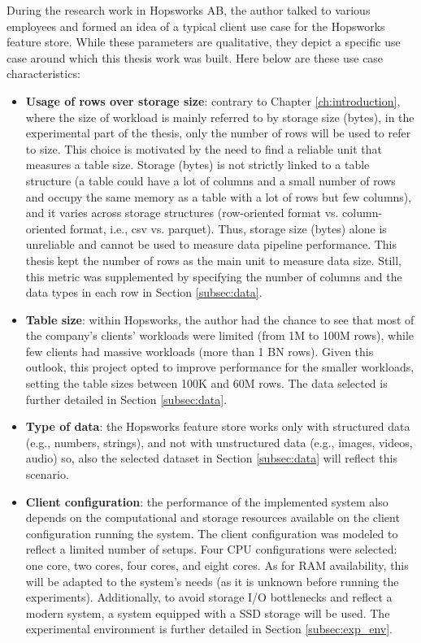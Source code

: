 During the research work in Hopsworks \gls{AB}, the author talked to various employees and formed an idea of a typical client use case for the Hopsworks feature store. While these parameters are qualitative, they depict a specific use case around which this thesis work was built. Here below are these use case characteristics:
\begin{itemize}
  \item \textbf{Usage of rows over storage size}: contrary to Chapter \ref{ch:introduction}, where the size of workload is mainly referred to by storage size (bytes), in the experimental part of the thesis, only the number of rows will be used to refer to size. This choice is motivated by the need to find a reliable unit that measures a table size. Storage (bytes) is not strictly linked to a table structure (a table could have a lot of columns and a small number of rows and occupy the same memory as a table with a lot of rows but few columns), and it varies across storage structures (row-oriented format vs. column-oriented format, i.e., csv vs. parquet). Thus, storage size (bytes) alone is unreliable and cannot be used to measure data pipeline performance. This thesis kept the number of rows as the main unit to measure data size. Still, this metric was supplemented by specifying the number of columns and the data types in each row in Section \ref{subsec:data}.
  \item \textbf{Table size}: within Hopsworks, the author had the chance to see that most of the company's clients' workloads were limited (from 1M to 100M rows), while few clients had massive workloads (more than 1 BN rows). Given this outlook, this project opted to improve performance for the smaller workloads, setting the table sizes between 100K and 60M rows. The data selected is further detailed in Section \ref{subsec:data}.
  \item \textbf{Type of data}: the Hopsworks feature store works only with structured data (e.g., numbers, strings), and not with unstructured data (e.g., images, videos, audio) so, also the selected dataset in Section \ref{subsec:data} will reflect this scenario.
  \item \textbf{Client configuration}: the performance of the implemented system also depends on the computational and storage resources available on the client configuration running the system. The client configuration
  was modeled to reflect a limited number of setups. Four \gls{CPU} configurations were selected: one core, two cores, four cores, and eight cores. As for \gls{RAM} availability, this will be adapted to the system's needs (as it is unknown before running the experiments). Additionally, to avoid storage I/O bottlenecks and reflect a modern system, a system equipped with a \gls{SSD} storage will be used. The experimental environment is further detailed in Section \ref{subsec:exp_env}.
\end{itemize}


